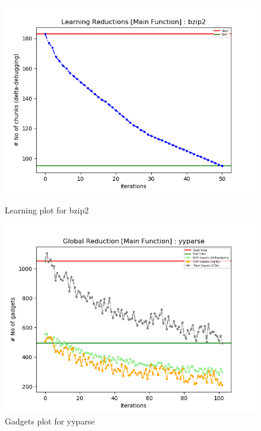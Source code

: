 \documentclass{relatorio}
\begin{document}
\begin{figure}[H]
	\includegraphics[width=0.65\linewidth]{imgs/chisel_learning_bzip2_plot.png}
	\caption{Learning plot for \color{blue} bzip2}%
	\label{fig:plant}
	\centering
	\captionsetup{justification=centering}
	\includegraphics[width=0.65\linewidth]{imgs/chisel_gadgets_yyparse_plot.png}
	\caption{Gadgets plot for \color{blue} yyparse}%
	\label{fig:plant}
\end{figure}
\end{document}
